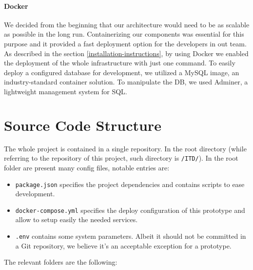 \documentclass[
]{article}
\begin{document}
\hypertarget{docker}{%
\paragraph{Docker}\label{docker}}
We decided from the beginning that our architecture would need to be as scalable as possible in the long run.
Containerizing our components was essential for this purpose and it provided a fast deployment option for the developers in out team. 
As described in the section \ref{installation-instructions}, by using Docker we enabled the deployment of the whole infrastructure with just one command.
To easily deploy a configured database for development, we utilized a MySQL image, an industry-standard container solution.
To manipulate the DB, we used Adminer, a lightweight management system for SQL.

\hypertarget{source-code-structure}{%
\section{Source Code Structure}\label{source-code-structure}}

The whole project is contained in a single repository. In the root directory (while referring to the repository of this project, such directory is \texttt{/ITD/}). In the root folder are present many config files, notable entries are:
\begin{itemize}
  \item \texttt{package.json} specifies the project dependencies and contains scripts to ease development.
  \item \texttt{docker-compose.yml} specifies the deploy configuration of this prototype and allow to setup easily the needed services.
  \item \texttt{.env} contains some system parameters. Albeit it should not be committed in a Git repository, we believe it's an acceptable exception for a prototype.
\end{itemize}

The relevant folders are the following:
\end{document}
